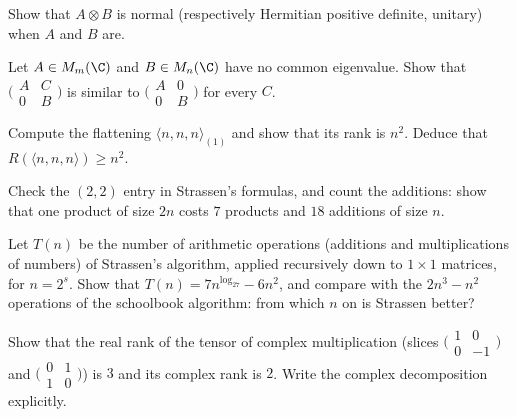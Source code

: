 \begin{exercise}[$\star$]\label{ex:kronnormal}
Show that $A\otimes B$ is normal (respectively Hermitian positive definite, unitary) when $A$ and $B$ are.
\end{exercise}

\begin{exercise}[$\star\star$]\label{ex:roth}
Let $A\in M_m(\C)$ and $B\in M_n(\C)$ have no common eigenvalue. Show that $\bigl(\begin{smallmatrix}A&C\\0&B\end{smallmatrix}\bigr)$ is similar to
$\bigl(\begin{smallmatrix}A&0\\0&B\end{smallmatrix}\bigr)$ for every $C$.
\end{exercise}

\begin{exercise}[$\star$]\label{ex:flattening}
Compute the flattening $\langle n,n,n\rangle_{(1)}$ and show that its rank is $n^2$. Deduce that $R(\langle n,n,n\rangle)\ge n^2$.
\end{exercise}

\begin{exercise}[$\star$]\label{ex:strassen22}
Check the $(2,2)$ entry in Strassen's formulas, and count the additions: show that one product of size $2n$ costs $7$ products and
$18$ additions of size $n$.
\end{exercise}

\begin{exercise}[$\star\star$]\label{ex:strassencount}
Let $T(n)$ be the number of arithmetic operations (additions and multiplications of numbers) of Strassen's algorithm, applied
recursively down to $1\times1$ matrices, for $n=2^s$. Show that $T(n)=7n^{\log_27}-6n^2$, and compare with the $2n^3-n^2$ operations of
the schoolbook algorithm: from which $n$ on is Strassen better?
\end{exercise}

\begin{exercise}[$\star\star$]\label{ex:complexmult}
Show that the real rank of the tensor of complex multiplication (slices $\bigl(\begin{smallmatrix}1&0\\0&-1\end{smallmatrix}\bigr)$ and
$\bigl(\begin{smallmatrix}0&1\\1&0\end{smallmatrix}\bigr)$) is $3$ and its complex rank is $2$. Write the complex decomposition explicitly.
\end{exercise}

